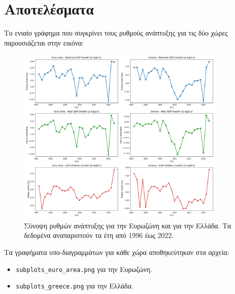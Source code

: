 \documentclass{article}
\begin{document}
\section{Αποτελέσματα}
Το ενιαίο γράφημα που συγκρίνει τους ρυθμούς ανάπτυξης για τις δύο χώρες παρουσιάζεται στην εικόνα:
\begin{figure}[h!]
    \centering
    \includegraphics[width=0.9\textwidth]{side_by_side_growth.png}
    \caption{Σύνοψη ρυθμών ανάπτυξης για την Ευρωζώνη και για την Ελλάδα. Τα δεδομένα αναπαριστούν τα έτη από 1996 έως 2022.}
\end{figure}

Τα γραφήματα υπο-διαγραμμάτων για κάθε χώρα αποθηκεύτηκαν στα αρχεία:
\begin{itemize}
    \item \texttt{subplots\_euro\_area.png} για την Ευρωζώνη.
    \item \texttt{subplots\_greece.png} για την Ελλάδα.
\end{itemize}
\end{document}
